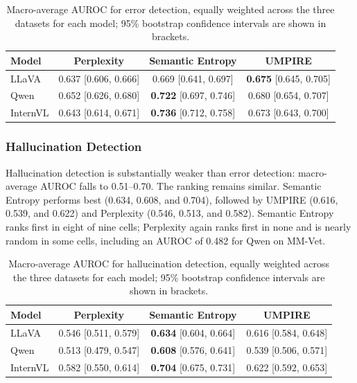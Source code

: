 \begin{table}[H]
\centering
\caption{Macro-average AUROC for error detection, equally weighted across the three datasets for each model; 95\% bootstrap confidence intervals are shown in brackets.}
\label{tab:error_detection}
\small
\setlength{\tabcolsep}{7pt}
\renewcommand{\arraystretch}{1.18}
\begin{tabular}{@{}lccc@{}}
\toprule
\textbf{Model} & \textbf{Perplexity} & \textbf{Semantic Entropy} & \textbf{UMPIRE} \\
\midrule
LLaVA & 0.637 {\scriptsize[0.606, 0.666]} & 0.669 {\scriptsize[0.641, 0.697]} & \textbf{0.675} {\scriptsize[0.645, 0.705]} \\
Qwen & 0.652 {\scriptsize[0.626, 0.680]} & \textbf{0.722} {\scriptsize[0.697, 0.746]} & 0.680 {\scriptsize[0.654, 0.707]} \\
InternVL & 0.643 {\scriptsize[0.614, 0.671]} & \textbf{0.736} {\scriptsize[0.712, 0.758]} & 0.673 {\scriptsize[0.643, 0.700]} \\
\bottomrule
\end{tabular}
\end{table}

\subsubsection{Hallucination Detection}

Hallucination detection is substantially weaker than error detection: macro-average AUROC falls to 0.51--0.70. The ranking remains similar. Semantic Entropy performs best (0.634, 0.608, and 0.704), followed by UMPIRE (0.616, 0.539, and 0.622) and Perplexity (0.546, 0.513, and 0.582). Semantic Entropy ranks first in eight of nine cells; Perplexity again ranks first in none and is nearly random in some cells, including an AUROC of 0.482 for Qwen on MM-Vet.

\begin{table}[H]
\centering
\caption{Macro-average AUROC for hallucination detection, equally weighted across the three datasets for each model; 95\% bootstrap confidence intervals are shown in brackets.}
\label{tab:hallucination_detection}
\small
\setlength{\tabcolsep}{7pt}
\renewcommand{\arraystretch}{1.18}
\begin{tabular}{@{}lccc@{}}
\toprule
\textbf{Model} & \textbf{Perplexity} & \textbf{Semantic Entropy} & \textbf{UMPIRE} \\
\midrule
LLaVA & 0.546 {\scriptsize[0.511, 0.579]} & \textbf{0.634} {\scriptsize[0.604, 0.664]} & 0.616 {\scriptsize[0.584, 0.648]} \\
Qwen & 0.513 {\scriptsize[0.479, 0.547]} & \textbf{0.608} {\scriptsize[0.576, 0.641]} & 0.539 {\scriptsize[0.506, 0.571]} \\
InternVL & 0.582 {\scriptsize[0.550, 0.614]} & \textbf{0.704} {\scriptsize[0.675, 0.731]} & 0.622 {\scriptsize[0.592, 0.653]} \\
\bottomrule
\end{tabular}
\end{table}

